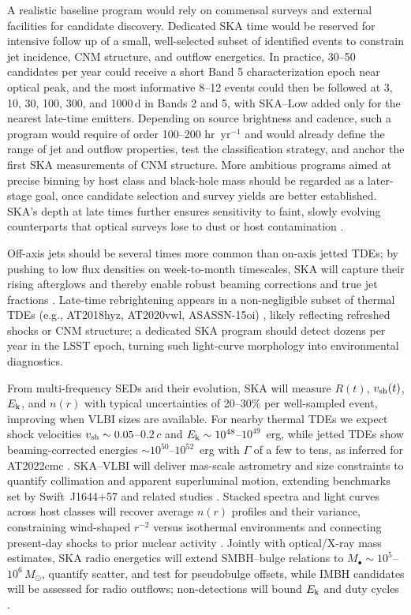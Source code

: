 \documentclass[a4paper,11pt]{article}
\begin{document}
A realistic baseline program would rely on commensal surveys and external facilities for candidate discovery. Dedicated SKA time would be reserved for intensive follow up of a small, well-selected subset of identified events to constrain jet incidence, CNM structure, and outflow energetics. 
 In practice, 30--50 candidates per year could receive a short Band 5 characterization epoch near optical peak, and the most informative 8--12 events could then be followed at 3, 10, 30, 100, 300, and 1000\,d in Bands 2 and 5, with SKA--Low added only for the nearest late-time emitters. Depending on source brightness and cadence, such a program would require of order 100--200 hr~yr$^{-1}$ and would already define the range of jet and outflow properties, test the classification strategy, and anchor the first SKA measurements of CNM structure. More ambitious programs aimed at precise binning by host class and black-hole mass should be regarded as a later-stage goal, once candidate selection and survey yields are better established. SKA's depth at late times further ensures sensitivity to faint, slowly evolving counterparts that optical surveys lose to dust or host contamination \citep{Alexander2020}.

Off-axis jets should be several times more common than on-axis jetted TDEs; by pushing to low flux densities on week-to-month timescales, SKA will capture their rising afterglows and thereby enable robust beaming corrections and true jet fractions \citep{Metzger2016,Mimica2015,Alexander2020}. Late-time rebrightening appears in a non-negligible subset of thermal TDEs (e.g., AT2018hyz, AT2020vwl, ASASSN-15oi)  \citep{Cendes2022,Goodwin2025,Horesh2021}, likely reflecting refreshed shocks or CNM structure; a dedicated SKA program should detect dozens per year in the LSST epoch, turning such light-curve morphology into environmental diagnostics.

From multi-frequency SEDs and their evolution, SKA will measure $R(t)$, $v_{\rm sh}(t)$, $E_{\rm k}$, and $n(r)$ with typical uncertainties of 20--30\% per well-sampled event, improving when VLBI sizes are available. For nearby thermal TDEs we expect shock velocities $v_{\rm sh}\sim 0.05$--$0.2\,c$ and $E_{\rm k}\sim 10^{48}$--$10^{49}$~erg, while jetted TDEs show beaming-corrected energies $\sim 10^{50}$--$10^{52}$~erg with $\Gamma$ of a few to tens, as inferred for AT2022cmc \citep{Yao2024,Rhodes2023}. SKA--VLBI will deliver mas-scale astrometry and size constraints to quantify collimation and apparent superluminal motion, extending benchmarks set by Swift~J1644+57 and related studies \citep{Paragi2015,Yang2016}. Stacked spectra and light curves across host classes will recover average $n(r)$ profiles and their variance, constraining wind-shaped $r^{-2}$ versus isothermal environments and connecting present-day shocks to prior nuclear activity \citep{Alexander2020,Metzger2016}. Jointly with optical/X-ray mass estimates, SKA radio energetics will extend SMBH--bulge relations to $M_\bullet\sim 10^{5}$--$10^{6}\,M_\odot$, quantify scatter, and test for pseudobulge offsets, while IMBH candidates will be assessed for radio outflows; non-detections will bound $E_{\rm k}$ and duty cycles \citep{vanVelzen2021,Greene2021}.
\end{document}
